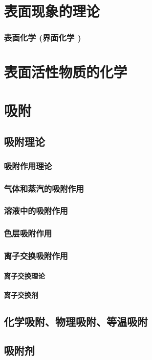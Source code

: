 \documentclass[UTF8]{../03-Chemistry}
\begin{document}
\section{表面现象的理论}
    \subsubsection{表面化学 (界面化学 )}
\section{表面活性物质的化学}
\section{吸附}
    \subsection{吸附理论}
        \subsubsection{吸附作用理论}
        \subsubsection{气体和蒸汽的吸附作用}
        \subsubsection{溶液中的吸附作用}
        \subsubsection{色层吸附作用}
        \subsubsection{离子交换吸附作用}
            \paragraph{离子交换理论}
            \paragraph{离子交换剂}
    \subsection{化学吸附、物理吸附、等温吸附}
    \subsection{吸附剂}
\end{document}
